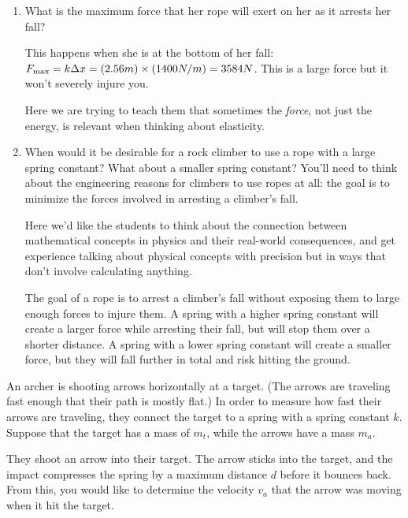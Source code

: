 \documentclass[12pt]{article}
\begin{document}
\begin{enumerate}
{	This comes out to 2.56 m for $\Delta x$; she falls 4m before the rope catches, so 6.56 m in total. 
}



\item{What is the maximum force that her rope will exert on her as it arrests her fall?}
{\color{red}This happens when she is at the bottom of her fall: $F_{\rm max} = k \Delta x = (2.56 m) \times (1400 N/m) = 3584 N$. This is a large force but it won't severely injure you. 

Here we are trying to teach them that sometimes the {\it force}, not just the energy, is relevant when thinking about elasticity.
}
	
	\item When would it be desirable for a rock climber to use a rope with a large spring constant? What about a smaller spring constant? You'll need to think about 
	the engineering reasons for climbers to use ropes at all: the goal is to minimize the forces involved in arresting a climber's fall.
	
	
	{\color{red}Here we'd like the students to think about the connection between mathematical concepts in physics and their real-world consequences, and get experience talking about physical concepts with precision but in ways that don't involve calculating anything. 
		
	The goal of a rope is to arrest a climber's fall without exposing them to large enough forces to injure them. A spring with a higher spring constant will create a larger force while arresting their fall, but will stop them over a shorter distance. A spring with a lower spring constant will create a smaller force, but they will fall further in total and risk hitting the ground.}
\end{enumerate}



An archer is shooting arrows horizontally at a target. (The arrows are traveling fast enough that their path is mostly flat.) In order to measure how fast their arrows are traveling, they connect the target to a spring with a spring constant $k$. Suppose that the target has a mass of $m_t$, while the arrows have a mass $m_a$.

They shoot an arrow into their target. The arrow sticks into the target, and the impact compresses the spring by a maximum distance $d$ before it bounces back. From this, you would like to determine the velocity $v_a$ that the arrow was moving when it hit the target.
\end{document}
